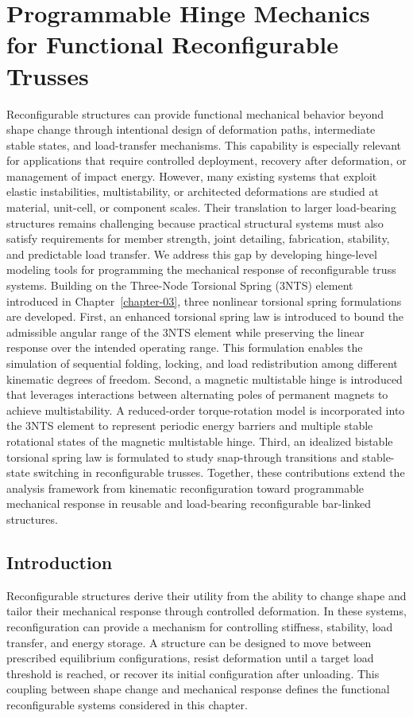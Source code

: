 \chapter{Programmable Hinge Mechanics for Functional Reconfigurable Trusses}\label{chapter-04}
Reconfigurable structures can provide functional mechanical behavior beyond shape change through intentional design of deformation paths, intermediate stable states, and load-transfer mechanisms. This capability is especially relevant for applications that require controlled deployment, recovery after deformation, or management of impact energy. However, many existing systems that exploit elastic instabilities, multistability, or architected deformations are studied at material, unit-cell, or component scales. Their translation to larger load-bearing structures remains challenging because practical structural systems must also satisfy requirements for member strength, joint detailing, fabrication, stability, and predictable load transfer. We address this gap by developing hinge-level modeling tools for programming the mechanical response of reconfigurable truss systems. Building on the Three-Node Torsional Spring (3NTS) element introduced in Chapter~\ref{chapter-03}, three nonlinear torsional spring formulations are developed. First, an enhanced torsional spring law is introduced to bound the admissible angular range of the 3NTS element while preserving the linear response over the intended operating range. This formulation enables the simulation of sequential folding, locking, and load redistribution among different kinematic degrees of freedom. Second, a magnetic multistable hinge is introduced that leverages interactions between alternating poles of permanent magnets to achieve multistability. A reduced-order torque-rotation model is incorporated into the 3NTS element to represent periodic energy barriers and multiple stable rotational states of the magnetic multistable hinge. Third, an idealized bistable torsional spring law is formulated to study snap-through transitions and stable-state switching in reconfigurable trusses. Together, these contributions extend the analysis framework from kinematic reconfiguration toward programmable mechanical response in reusable and load-bearing reconfigurable bar-linked structures.

\section{Introduction}\label{04-sec-functional-intro}
Reconfigurable structures derive their utility from the ability to change shape and tailor their mechanical response through controlled deformation. In these systems, reconfiguration can provide a mechanism for controlling stiffness, stability, load transfer, and energy storage. A structure can be designed to move between prescribed equilibrium configurations, resist deformation until a target load threshold is reached, or recover its initial configuration after unloading. This coupling between shape change and mechanical response defines the functional reconfigurable systems considered in this chapter.

